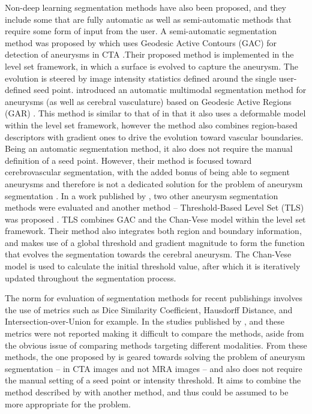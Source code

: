Non-deep learning segmentation methods have also been proposed, and they include some that are fully automatic as well as semi-automatic methods that require some form of input from the user. A semi-automatic segmentation method was proposed by \citeauthor{Firouzian2011} which uses Geodesic Active Contours (GAC) for detection of aneurysms in CTA \cite{Firouzian2011}.Their proposed method is implemented in the level set framework, in which a surface is evolved to capture the aneurysm. The evolution is steered by image intensity statistics defined around the single user-defined seed point. \citeauthor{Bogunovic2011} introduced an automatic multimodal segmentation method for aneurysms (as well as cerebral vasculature) based on Geodesic Active Regions (GAR) \cite{Bogunovic2011}. This method is similar to that of \citeauthor{Firouzian2011} in that it also uses a deformable model within the level set framework, however the method also combines region-based descriptors with gradient ones to drive the evolution toward vascular boundaries. Being an automatic segmentation method, it also does not require the manual definition of a seed point. However, their method is focused toward cerebrovascular segmentation, with the added bonus of being able to segment aneurysms and therefore is not a dedicated solution for the problem of aneurysm segmentation . In a work published by \citeauthor{Sen2013}, two other aneurysm segmentation methods were evaluated and another method -- Threshold-Based Level Set (TLS) was proposed \cite{Sen2013}. TLS combines GAC and the Chan-Vese model \cite{Chan2001} within the level set framework. Their method also integrates both region and boundary information, and makes use of a global threshold and gradient magnitude to form the function that evolves the segmentation towards the cerebral aneurysm. The Chan-Vese model is used to calculate the initial threshold value, after which it is iteratively updated throughout the segmentation process. 

The norm for evaluation of segmentation methods for recent publishings involves the use of metrics such as Dice Similarity Coefficient, Hausdorff Distance, and Intersection-over-Union for example. In the studies published by \citeauthor{Firouzian2011}, \citeauthor{Bogunovic2011} and \citeauthor{Sen2013} these metrics were not reported making it difficult to compare the methods, aside from the obvious issue of comparing methods targeting different modalities. From these methods, the one proposed by \citeauthor{Sen2013} is geared towards solving the problem of aneurysm segmentation -- in CTA images and not MRA images -- and also does not require the manual setting of a seed point or intensity threshold. It aims to combine the method described by \citeauthor{Firouzian2011} with another method, and thus could be assumed to be more appropriate for the problem. 


